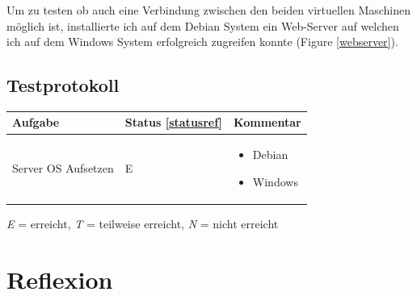 \documentclass[12pt,a4paper,twoside,titlepage]{article}
\begin{document}
        Um zu testen ob auch eine Verbindung zwischen den beiden virtuellen Maschinen möglich ist, installierte ich auf dem Debian System ein Web-Server auf welchen ich auf dem Windows System erfolgreich zugreifen konnte (Figure \ref{webserver}).

        \subsection{Testprotokoll}


        \begin{tabular}{|l|l|p{5cm}|}
          \hline
          \textbf{Aufgabe} & \textbf{Status \ref{statusref}} & \textbf{Kommentar} \\\hline
          Server OS Aufsetzen & E & \begin{itemize}
          \item Debian
          \item Windows
          \end{itemize} \\\hline
        \end{tabular}

        \label{statusref}
        \textit{E} = erreicht, \textit{T} = teilweise erreicht, \textit{N} = nicht erreicht 
        
        \section{Reflexion}
        
        
\end{document}
